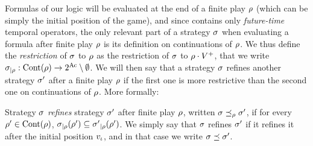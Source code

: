 Formulas of our logic \SLref will be evaluated at the end of a finite play
$\rho$ (which can be simply the initial position of the game), and
since \SLref contains only \emph{future-time} temporal operators,
the only relevant part of a strategy $\sigma$ when evaluating  a
formula after finite play $\rho$ is its definition on continuations
of $\rho$. We thus define the \emph{restriction} of $\sigma$ to
$\rho$ as the restriction of $\sigma$ to $\rho\cdot V^+$, that we
write ${\sigma}_{|\rho}:\text{Cont}(\rho)\to 2^{\textnormal{Ac}}\setminus\emptyset$.
We will then say that a strategy $\sigma$ refines another strategy
$\sigma'$ after a finite play $\rho$ if the first one is more
restrictive than the second one on continuations of $\rho$. More formally:

\begin{definition}
  Strategy $\sigma$ \emph{refines} strategy $\sigma'$  after finite
  play $\rho$, written $\sigma \preceq_{\rho} \sigma'$, if for every  $\rho'\in\text{Cont}(\rho)$,
  ${\sigma}_{|\rho}(\rho')\subseteq {\sigma'}_{|\rho}(\rho')$.
  We simply say that $\sigma$ refines $\sigma'$ if it refines it after
  the initial position $v_{\iota}$, and in that case we write
  $\sigma\preceq \sigma'$.
\end{definition}

